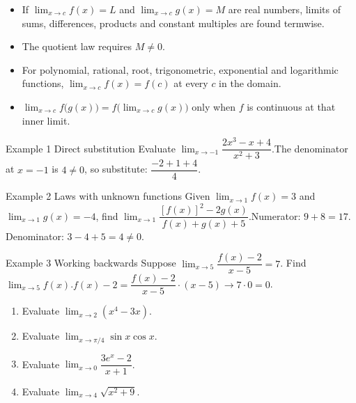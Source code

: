 \documentclass[11pt]{article}
\begin{document}

\begin{ideabox}
\begin{itemize}[leftmargin=*,itemsep=2pt,topsep=2pt]
  \item If $\displaystyle\lim_{x\to c}f(x)=L$ and $\displaystyle\lim_{x\to c}g(x)=M$ are real numbers, limits of sums, differences, products and constant multiples are found termwise.
  \item The quotient law requires $M\neq0$.
  \item For polynomial, rational, root, trigonometric, exponential and logarithmic functions, $\displaystyle\lim_{x\to c}f(x)=f(c)$ at every $c$ in the domain.
  \item $\displaystyle\lim_{x\to c}f\big(g(x)\big)=f\big(\displaystyle\lim_{x\to c}g(x)\big)$ only when $f$ is continuous at that inner limit.
\end{itemize}
\end{ideabox}

\begin{example}{Example 1 \textperiodcentered{} Direct substitution}
Evaluate $\displaystyle\lim_{x\to -1}\dfrac{2x^3-x+4}{x^2+3}$.\soln The denominator at $x=-1$ is $4\neq0$, so substitute: $\dfrac{-2+1+4}{4}$.
\end{example}

\begin{example}{Example 2 \textperiodcentered{} Laws with unknown functions}
Given $\displaystyle\lim_{x\to 1}f(x)=3$ and $\displaystyle\lim_{x\to 1}g(x)=-4$, find $\displaystyle\lim_{x\to 1}\dfrac{[f(x)]^2-2g(x)}{f(x)+g(x)+5}$.\soln Numerator: $9+8=17$. Denominator: $3-4+5=4\neq0$.
\end{example}

\begin{example}{Example 3 \textperiodcentered{} Working backwards}
Suppose $\displaystyle\lim_{x\to 5}\dfrac{f(x)-2}{x-5}=7$. Find $\displaystyle\lim_{x\to 5}f(x)$.\soln $f(x)-2=\dfrac{f(x)-2}{x-5}\cdot(x-5)\to7\cdot0=0$.
\end{example}

\newpage
{}

\begin{enumerate}[leftmargin=*,itemsep=2pt]
  \item Evaluate $\displaystyle\lim_{x\to 2}\left(x^4-3x\right)$.\work{2.3cm}
  \item Evaluate $\displaystyle\lim_{x\to \pi/4}\sin x\cos x$.\work{2.3cm}
  \item Evaluate $\displaystyle\lim_{x\to 0}\dfrac{3e^x-2}{x+1}$.\work{2.3cm}
  \item Evaluate $\displaystyle\lim_{x\to 4}\sqrt{x^2+9}$.\work{2.3cm}
\end{enumerate}
\end{document}
